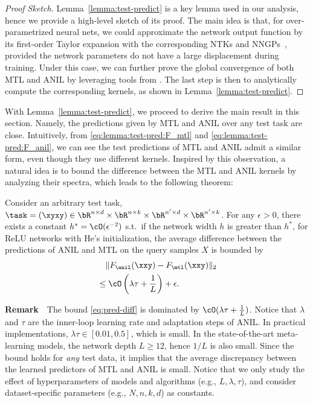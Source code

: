 \documentclass{article}
\begin{document}
\begin{proof}[Proof Sketch]
Lemma~\ref{lemma:test-predict} is a key lemma used in our analysis, hence we provide a high-level sketch of its proof. The main idea is that, for over-parametrized neural nets, we could approximate the network output function by its first-order Taylor expansion with the corresponding NTKs and NNGPs~\citep{lee2019wide}, provided the network parameters do not have a large displacement during training. Under this case, we can further prove the global convergence of both MTL and ANIL by leveraging tools from \citet{meta-ntk}. The last step is then to analytically compute the corresponding kernels, as shown in Lemma~\ref{lemma:test-predict}.
\end{proof}









With Lemma~\ref{lemma:test-predict}, we proceed to derive the main result in this section. Namely, the predictions given by MTL and ANIL over any test task are close. Intuitively, from \eqref{eq:lemma:test-pred:F_mtl} and \eqref{eq:lemma:test-pred:F_anil}, we can see the test predictions of MTL and ANIL admit a similar form, even though they use different kernels. Inspired by this observation, a natural idea is to bound the difference between the MTL and ANIL kernels by analyzing their spectra, which leads to the following theorem:

\begin{theorem}\label{thm:closeness}
Consider an arbitrary test task, $\task=(\xyxy) \in \bR^{n\times d}\times  \bR^{n\times k}\times \bR^{n'\times d}\times \bR^{n'\times k}$. For any $\epsilon>0$, there exists a constant $h^* = \cO(\epsilon^{-2})$ s.t.\ if the network width $h$ is greater than $h^*$, for ReLU networks with He's initialization, the average difference between the predictions of ANIL and MTL on the query samples $X$ is bounded by 
\begin{align}\label{eq:pred-diff}
    &\quad  \|F_\anil(\xxy) - F_\mtl(\xxy)\|_2 \nonumber \\
    & \leq \cO\left(\lambda \tau  + \frac{1}{L}\right) + \epsilon.
\end{align}
\end{theorem}


\textbf{Remark}~~The bound \eqref{eq:pred-diff} is dominated by $\cO(\lambda \tau + \frac{1}{L})$. Notice that $\lambda$ and $\tau$ are the inner-loop learning rate and adaptation steps of ANIL. In practical implementations, $\lambda \tau \in [0.01,0.5]$, which is small. In the state-of-the-art meta-learning models, the network depth $L \geq 12$, hence $1/L$ is also small. Since the bound holds for \emph{any} test data, it implies that the average discrepancy between the learned predictors of MTL and ANIL is small. Notice that we only study the effect of hyperparameters of models and algorithms (e.g., $L,\lambda, \tau$), and consider dataset-specific parameters (e.g., $N,n,k,d$) as constants.
\end{document}

